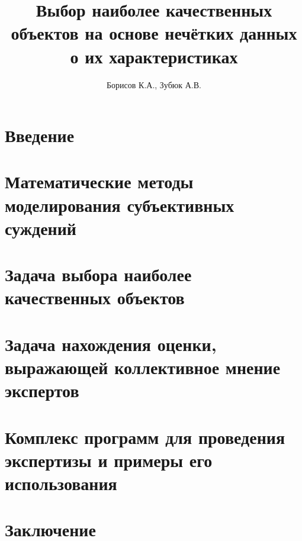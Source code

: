 \documentclass[14pt]{extarticle}
\begin{document}

\thispagestyle{empty}			

\title{Выбор наиболее качественных объектов на основе нечётких данных о их характеристиках} 
\author{Борисов К.А., Зубюк А.В.}
\maketitle

\tableofcontents
\newpage

\section{Введение} 
%

\section{Математические методы моделирования субъективных суждений}


\section{Задача выбора наиболее качественных объектов}
% 

\section{Задача нахождения оценки, выражающей коллективное мнение экспертов}


\section{Комплекс программ для проведения экспертизы и примеры его использования }
%

\section{Заключение}
 

\printbibliography[heading=bibintoc]
\end{document}
